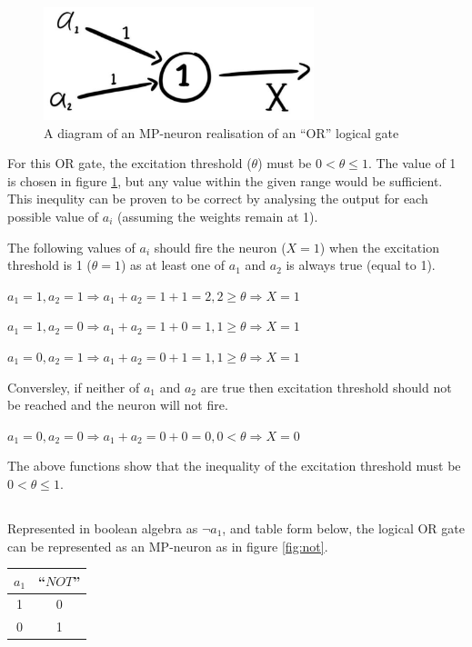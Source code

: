 \documentclass[a4paper]{report}
\begin{document}
\begin{figure}[H]
    \centering
    \includegraphics[width=0.7\textwidth]{images/or.png}
    \caption{A diagram of an MP-neuron realisation of an
        “OR” logical gate}
    \label{fig:or}
\end{figure}

For this OR gate, the excitation threshold (\(\theta\)) must be \(0 < \theta \leq 1\). The value of 1 is chosen in figure \ref{fig:or}, but any value within the given range would be sufficient. This inequlity can be proven to be correct by analysing the output for each possible value of \(a_i\) (assuming the weights remain at 1).

The following values of \(a_i\) should fire the neuron (\(X = 1\)) when the excitation threshold is 1 (\(\theta = 1\)) as at least one of \(a_1\) and \(a_2\) is always true (equal to 1).

\(a_1 = 1, a_2 = 1 \Rightarrow  a_1 + a_2 = 1 + 1 = 2, 2 \geq \theta \Rightarrow X = 1\)

\(a_1 = 1, a_2 = 0 \Rightarrow  a_1 + a_2 = 1 + 0 = 1, 1 \geq \theta \Rightarrow X = 1\)

\(a_1 = 0, a_2 = 1 \Rightarrow  a_1 + a_2 = 0 + 1 = 1, 1 \geq \theta \Rightarrow X = 1\)

Conversley, if neither of \(a_1\) and \(a_2\) are true then excitation threshold should not be reached and the neuron will not fire.

\(a_1 = 0, a_2 = 0 \Rightarrow  a_1 + a_2 = 0 + 0 = 0, 0 < \theta \Rightarrow X = 0\)

The above functions show that the inequality of the excitation threshold must be \(0 < \theta \leq 1\).

\subsection{}

Represented in boolean algebra as \(\neg a_1\), and table form below, the logical OR gate can be represented as an MP-neuron as in figure \ref{fig:not}.

\begin{tabular}{| c | c |}
    \hline
    \(a_1\) & ``\(NOT\)'' \\ [0.5ex]
    \hline\hline
    1       & 0           \\
    \hline
    0       & 1           \\ [1ex]
    \hline
\end{tabular}
\linebreak
\linebreak
\end{document}
